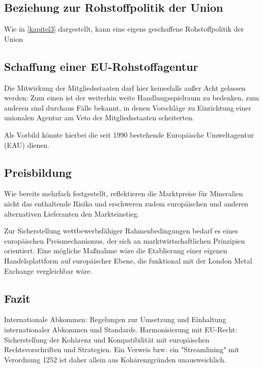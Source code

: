 \documentclass[12pt,a4paper,oneside]{book} %
\begin{document}
\subsection{Beziehung zur Rohstoffpolitik der Union}
Wie in \ref{kapitel3} dargestellt, kann eine eigens geschaffene Rohstoffpolitik der Union 

\subsection{Schaffung einer EU-Rohstoffagentur}

Die Mitwirkung der Mitgliedsstaaten darf hier keinesfalls außer Acht gelassen werden: Zum einen ist der weiterhin weite Handlungsspielraum zu bedenken, zum anderen sind durchaus Fälle bekannt, in denen Vorschläge zu Einrichtung einer unionalen Agentur am Veto der Mitgliedsstaaten scheiterten.\autocite[im konkreten Fall ging es um die Einführung einer EU-Agentur zur Kontrolle der Umsetzung des EU-Abfallrechts]{Dauses/Ludwigs, O. Umweltpolitik Rn. 226; Europäische Kommission: Study on the feasibility of the establishment of a Waste Implementation Agency}

Als Vorbild könnte hierbei die seit 1990 bestehende Europäische Umweltagentur (EAU) dienen.

\subsection{Preisbildung}
Wie bereits mehrfach festgestellt, reflektieren die Marktpreise für Mineralien nicht das enthaltende Risiko und erschweren zudem europäischen und anderen alternativen Lieferanten den Markteinstieg.

Zur Sicherstellung wettbewerbsfähiger Rahmenbedingungen bedarf es eines europäischen Preismechanismus, der sich an marktwirtschaftlichen Prinzipien orientiert. Eine mögliche Maßnahme wäre die Etablierung einer eigenen Handelsplattform auf europäischer Ebene, die funktional mit der London Metal Exchange vergleichbar wäre.

\subsection{Fazit}



Internationale Abkommen: Regelungen zur Umsetzung und Einhaltung internationaler Abkommen und Standards.
Harmonisierung mit EU-Recht: Sicherstellung der Kohärenz und Kompatibilität mit europäischen Rechtsvorschriften und Strategien.
Ein Verweis bzw. ein "Streamlining" mit Verordnung 1252 ist daher allein aus Kohärenzgründen unausweichlich.
\end{document}
